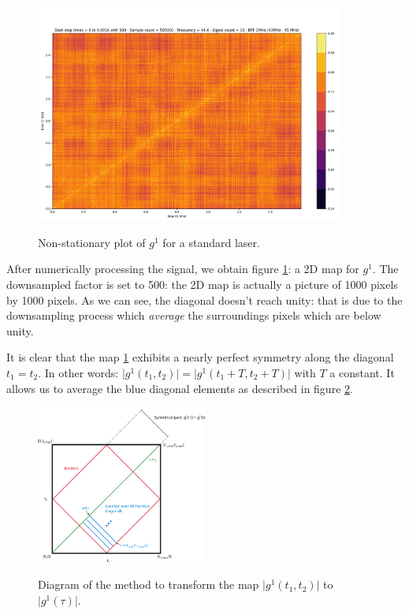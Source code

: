 \documentclass[10pt]{report}
\begin{document}
\begin{figure}[h!]
\caption{Non-stationary plot of $g^1$ for a standard laser.}
\centering
\includegraphics[width=0.9\textwidth]{st-g12}
\label{fig:st-g12}
\end{figure}
After numerically processing the signal, we obtain figure \ref{fig:st-g12}: a 2D map for $g^1$. The downsampled factor is set to 500: the 2D map is actually a picture of 1000 pixels by 1000 pixels. As we can see, the diagonal doesn't reach unity: that is due to the downsampling process which \textit{average} the surroundings pixels which are below unity.

It is clear that the map \ref{fig:st-g12} exhibits a nearly perfect symmetry along the diagonal $t_1=t_2$. In other words: $\vert g^1(t_1, t_2) \vert = \vert g^1(t_1 + T, t_2 + T) \vert$ with $T$ a constant. It allows us to average the blue diagonal elements as described in figure \ref{fig:to-st}.

\begin{figure}[h!]
\caption{Diagram of the method to transform the map $\vert g^1(t_1, t_2) \vert$ to $\vert g^1(\tau) \vert$.}
\centering
\includegraphics[width=0.5\textwidth]{to-st}
\label{fig:to-st}
\end{figure}
\end{document}

